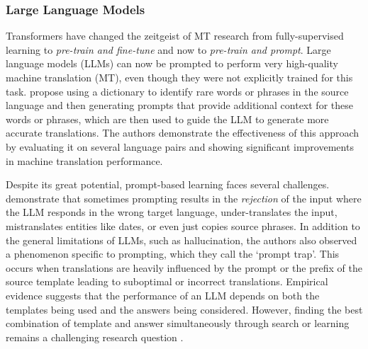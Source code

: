 \documentclass[11pt]{article}
\begin{document}
\subsubsection*{Large Language Models} \label{sec:llms}  \vspace{-2mm}
Transformers have changed the zeitgeist of MT research from fully-supervised learning to \textit{pre-train and fine-tune} and now to \textit{pre-train and prompt}.
Large language models (LLMs) can now be prompted to perform very high-quality machine translation (MT), even though they were not explicitly trained for this task.
\cite{ghazvininejad2023dictionary} propose using a dictionary to identify rare words or phrases in the source language and then generating prompts that provide additional context for these words or phrases, which are then used to guide the LLM to generate more accurate translations. The authors demonstrate the effectiveness of this approach by evaluating it on several language pairs and showing significant improvements in machine translation performance.

Despite its great potential, prompt-based learning faces several challenges.
\cite{zhang2023prompting} demonstrate that sometimes prompting results in the \textit{rejection} of the input where the LLM responds in the wrong target language, under-translates the input, mistranslates entities like dates, or even just copies source phrases. In addition to the general limitations of LLMs, such as hallucination, the authors also observed a phenomenon specific to prompting, which they call the `prompt trap'. This occurs when translations are heavily influenced by the prompt or the prefix of the source template leading to suboptimal or incorrect translations.
Empirical evidence suggests that the performance of an LLM depends on both the templates being used and the answers being considered. However, finding the best combination of template and answer simultaneously through search or learning remains a challenging research question \citep{liu2023pre}.

\end{document}
